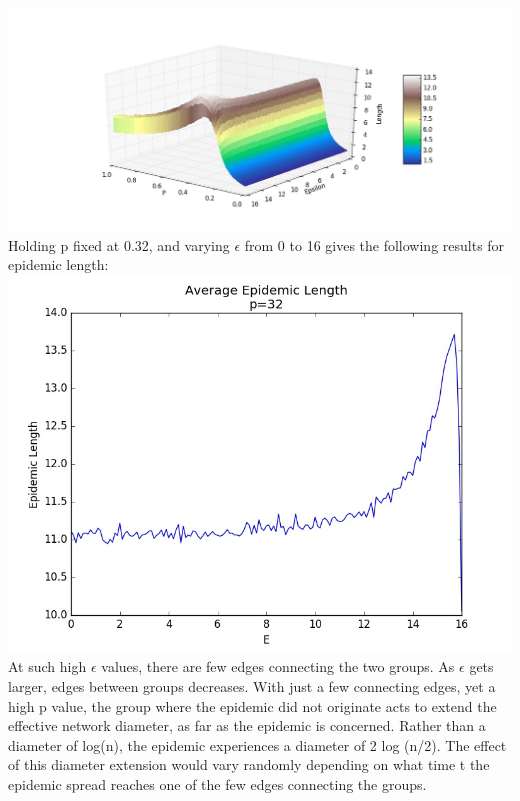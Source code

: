 \documentclass[11pt, oneside]{article}   	%
\begin{document}
\includegraphics[scale=0.33]{last.jpg}\\
\indent Holding p fixed at 0.32, and varying $\epsilon$ from 0 to 16 gives the following results for epidemic length:\\
\includegraphics[scale=0.5]{P32length}\\
\indent At such high $\epsilon$ values, there are few edges connecting the two groups.  As $\epsilon$ gets larger, edges between groups decreases.  With just a few connecting edges, yet a high p value, the group where the epidemic did not originate acts to extend the effective network diameter, as far as the epidemic is concerned.  Rather than a diameter of log(n), the epidemic experiences a diameter of 2 log (n/2).  The effect of this diameter extension would vary randomly depending on what time t the epidemic spread reaches one of the few edges connecting the groups.\\
\end{document}
